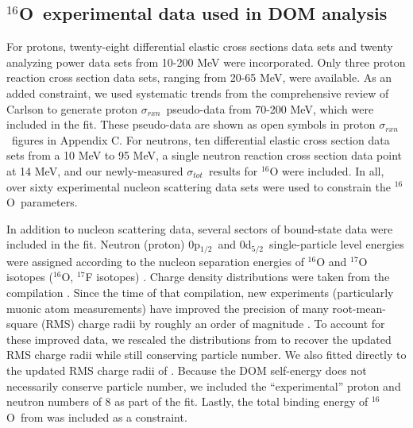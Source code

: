 \documentclass[twocolumn,secnumarabic,amssymb, nobibnotes, aps, prl,
superscriptaddress, nobalancelastpage, draft]{revtex4}
\newcommand{\tot}{\ensuremath{\sigma_{tot}}}
\newcommand{\rxn}{\ensuremath{\sigma_{rxn}}}
\newcommand{\oSix}{\ensuremath{^{16}}O}
\newcommand{\pOne}{p\ensuremath{_{1/2}}}
\newcommand{\dFive}{d\ensuremath{_{5/2}}}
\begin{document}
\subsection{\oSix\ experimental data used in DOM analysis}
For protons, twenty-eight differential elastic cross
sections data sets and twenty analyzing power data sets from 10-200 MeV were
incorporated. Only three proton reaction cross section data sets, ranging from 20-65 MeV,
were available. As an added constraint, we used systematic trends
from the comprehensive review of Carlson \cite{Carlson1975} to generate proton
\rxn\ pseudo-data from 70-200 MeV, which were included in the fit.
These pseudo-data are shown as open symbols in proton \rxn\ figures in
Appendix C.
For neutrons, ten differential elastic cross section
data sets from a 10 MeV to 95 MeV, a single
neutron reaction cross section data point at 14 MeV, and our newly-measured \tot\ results
for $^{16}$O were included. In all, over sixty experimental nucleon scattering
data sets were used to constrain the \oSix\ parameters.

In addition to nucleon scattering data, several sectors of bound-state data were
included in the fit. Neutron (proton) 0\pOne\ and 0\dFive\
single-particle level energies were
assigned according to the nucleon separation energies of $^{16}$O and
$^{17}$O isotopes ($^{16}$O, $^{17}$F isotopes) \cite{AME2016}.
Charge density distributions were taken from the compilation \cite{DeVries1987}.
Since the time of that compilation,
new experiments (particularly muonic atom measurements) have improved the precision
of many root-mean-square (RMS) charge radii by roughly an order of magnitude \cite{Angeli2013}.
To account for these improved data, we rescaled the distributions from
\cite{DeVries1987} to recover the updated
RMS charge radii while still conserving particle number. We also fitted directly
to the updated RMS charge radii of \cite{Angeli2013}.
Because the DOM self-energy does not necessarily conserve particle number, we
included the ``experimental'' proton and neutron numbers of 8 as part of the
fit. Lastly, the total binding energy of \oSix\ from \cite{AME2016} was
included as a constraint. 
\end{document}

